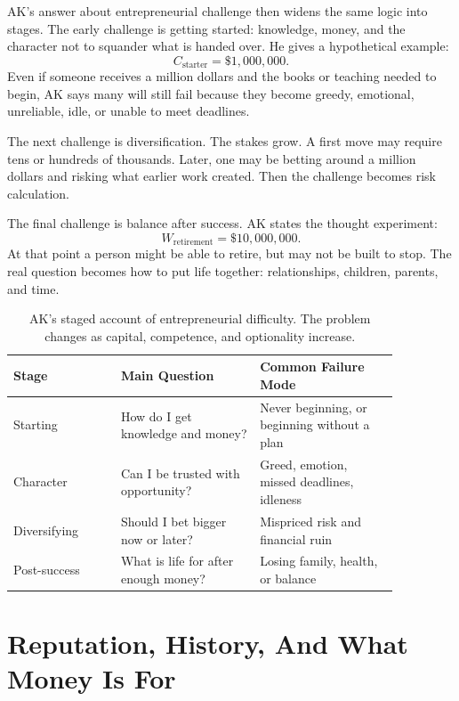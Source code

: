 AK's answer about entrepreneurial challenge then widens the same logic into stages. The early challenge is getting started: knowledge, money, and the character not to squander what is handed over. He gives a hypothetical example:
\begin{equation}
C_{\mathrm{starter}}=\$1{,}000{,}000.
\end{equation}
Even if someone receives a million dollars and the books or teaching needed to begin, AK says many will still fail because they become greedy, emotional, unreliable, idle, or unable to meet deadlines.

The next challenge is diversification. The stakes grow. A first move may require tens or hundreds of thousands. Later, one may be betting around a million dollars and risking what earlier work created. Then the challenge becomes risk calculation.

The final challenge is balance after success. AK states the thought experiment:
\begin{equation}
W_{\mathrm{retirement}}=\$10{,}000{,}000.
\end{equation}
At that point a person might be able to retire, but may not be built to stop. The real question becomes how to put life together: relationships, children, parents, and time.

\begin{table}
\centering
\begin{tabular}{|p{0.24\linewidth}|p{0.31\linewidth}|p{0.31\linewidth}|}
\hline
Stage & Main Question & Common Failure Mode \\
\hline
Starting & How do I get knowledge and money? & Never beginning, or beginning without a plan \\
\hline
Character & Can I be trusted with opportunity? & Greed, emotion, missed deadlines, idleness \\
\hline
Diversifying & Should I bet bigger now or later? & Mispriced risk and financial ruin \\
\hline
Post-success & What is life for after enough money? & Losing family, health, or balance \\
\hline
\end{tabular}
\caption{AK's staged account of entrepreneurial difficulty. The problem changes as capital, competence, and optionality increase.}
\end{table}

\section{Reputation, History, And What Money Is For}

